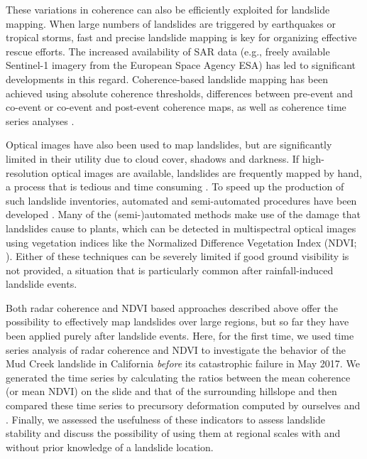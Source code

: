 \documentclass[nhess, manuscript]{copernicus}
\begin{document}
These variations in coherence can also be efficiently exploited for landslide mapping. When large numbers of landslides are triggered by earthquakes or tropical storms, fast and precise landslide mapping is key for organizing effective rescue efforts. The increased availability of SAR data (e.g., freely available Sentinel-1 imagery from the European Space Agency ESA) has led to significant developments in this regard. Coherence-based landslide mapping has been achieved using absolute coherence thresholds, differences between pre-event and co-event or co-event and post-event coherence maps, as well as coherence time series analyses \citep{burrows2019, yun2015, ohki2020, jung2020}. \par 

Optical images have also been used to map landslides, but are significantly limited in their utility due to cloud cover, shadows and darkness. If high-resolution optical images are available, landslides are frequently mapped by hand, a process that is tedious and time consuming \citep[e.g.][]{roback2018}. To speed up the production of such landslide inventories, automated and semi-automated procedures have been developed \citep{guzzetti2012, fiorucci2019, behling2014, behling2014a, mondini2011}. Many of the (semi-)automated methods make use of the damage that landslides cause to plants, which can be detected in multispectral optical images using vegetation indices like the Normalized Difference Vegetation Index (NDVI; \cite{tucker1979, Rosenthal1985}). Either of these techniques can be severely limited if good ground visibility is not provided, a situation that is particularly common after rainfall-induced landslide events. \par

Both radar coherence and NDVI based approaches described above offer the possibility to effectively map landslides over large regions, but so far they have been applied purely after landslide events. Here, for the first time, we used time series analysis of radar coherence and NDVI to investigate the behavior of the Mud Creek landslide in California \textit{before} its catastrophic failure in May 2017. We generated the time series by calculating the ratios between the mean coherence (or mean NDVI) on the slide and that of the surrounding hillslope and then compared these time series to precursory deformation computed by ourselves and \cite{handwerger2019}. Finally, we assessed the usefulness of these indicators to assess landslide stability and discuss the possibility of using them at regional scales with and without prior knowledge of a landslide location. 
\end{document}
